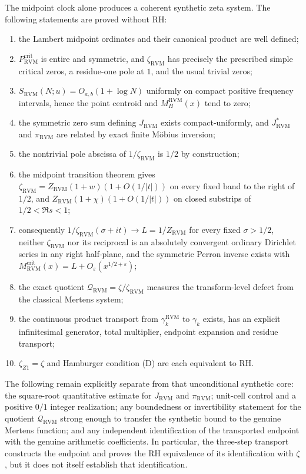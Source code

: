\documentclass[11pt,reqno]{amsart}
\theoremstyle{definition}
\theoremstyle{remark}
\newcommand{\RVM}{\mathrm{RVM}}
\newcommand{\crit}{\mathrm{crit}}
\begin{document}
The midpoint clock alone produces a coherent synthetic zeta system.  The following statements are proved without RH:
\begin{enumerate}[label=\textup{(\arabic*)}]
\item the Lambert midpoint ordinates and their canonical product are well defined;
\item $P_{\RVM}^{\crit}$ is entire and symmetric, and $\zeta_{\RVM}$ has precisely the prescribed simple critical zeros, a residue-one pole at $1$, and the usual trivial zeros;
\item $S_{\RVM}(N;u)=O_{a,b}(1+\log N)$ uniformly on compact positive frequency intervals, hence the point centroid and $M_H^{\RVM}(x)$ tend to zero;
\item the symmetric zero sum defining $J_{\RVM}$ exists compact-uniformly, and $J_{\RVM}^{*}$ and $\pi_{\RVM}$ are related by exact finite M\"obius inversion;
\item the nontrivial pole abscissa of $1/\zeta_{\RVM}$ is $1/2$ by construction;
\item the midpoint transition theorem gives $\zeta_{\RVM}=Z_{\RVM}(1+w)(1+O(1/|t|))$ on every fixed band to the right of $1/2$, and $Z_{\RVM}(1+\chi)(1+O(1/|t|))$ on closed substrips of $1/2<\Re s<1$;
\item consequently $1/\zeta_{\RVM}(\sigma+it)\to L=1/Z_{\RVM}$ for every fixed $\sigma>1/2$, neither $\zeta_{\RVM}$ nor its reciprocal is an absolutely convergent ordinary Dirichlet series in any right half-plane, and the symmetric Perron inverse exists with
$M_{\RVM}^{\crit}(x)=L+O_\varepsilon(x^{1/2+\varepsilon})$;
\item the exact quotient $\mathcal Q_{\RVM}=\zeta/\zeta_{\RVM}$ measures the transform-level defect from the classical Mertens system;
\item the continuous product transport from $\gamma_k^{\RVM}$ to $\gamma_k$ exists, has an explicit infinitesimal generator, total multiplier, endpoint expansion and residue transport;
\item $\zeta_{Z1}=\zeta$ and Hamburger condition (D) are each equivalent to RH.
\end{enumerate}

The following remain explicitly separate from that unconditional synthetic core: the square-root quantitative estimate for $J_{\RVM}$ and $\pi_{\RVM}$; unit-cell control and a positive $0/1$ integer realization; any boundedness or invertibility statement for the quotient $\mathcal Q_{\RVM}$ strong enough to transfer the synthetic bound to the genuine Mertens function; and any independent identification of the transported endpoint with the genuine arithmetic coefficients.  In particular, the three-step transport constructs the endpoint and proves the RH equivalence of its identification with $\zeta$, but it does not itself establish that identification.
\end{document}
